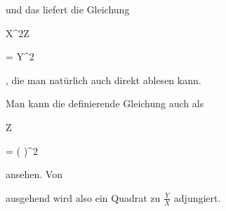 { und das liefert die Gleichung


\mavergleichskette

{\vergleichskette

{ X^2Z
}

{ = }{ Y^2
}

{  }{
}

{    }{
}

{   }{
}

}
{}{}{,}
die man natürlich auch direkt ablesen kann.


Man kann die definierende Gleichung auch als


\mavergleichskette

{\vergleichskette

{ Z
}

{ = }{ \left(  {  }  \right)^2
}

{  }{
}

{    }{
}

{   }{
}

}
{}{}{}
ansehen. Von

 ausgehend wird also ein Quadrat zu ${ \frac{   Y  }{  X  } }$ adjungiert.


}



